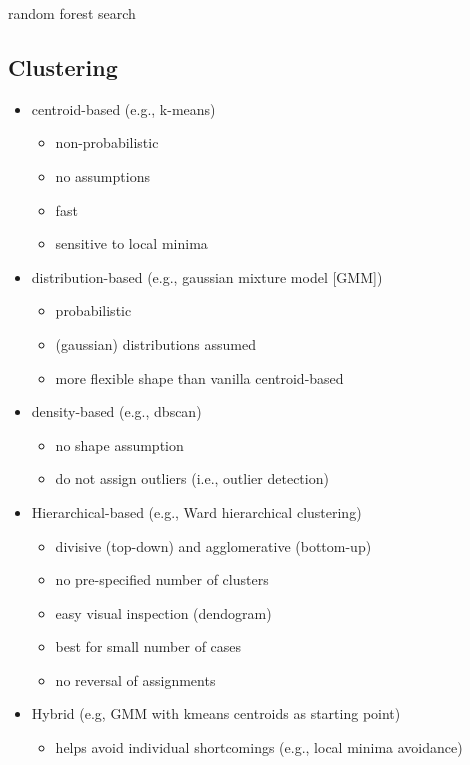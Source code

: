 random forest search \citep[][]{}

\subsection{Clustering}

\begin{itemize}
  \item centroid-based (e.g., k-means)
  \begin{itemize}
    \item non-probabilistic
    \item no assumptions
    \item fast
    \item sensitive to local minima
  \end{itemize}
  \item distribution-based (e.g., gaussian mixture model [GMM])
  \begin{itemize}
    \item probabilistic
    \item (gaussian) distributions assumed
    \item more flexible shape than vanilla centroid-based
  \end{itemize}
  \item density-based (e.g., dbscan)
  \begin{itemize}
    \item no shape assumption
    \item do not assign outliers (i.e., outlier detection)
  \end{itemize}
  \item Hierarchical-based (e.g., Ward hierarchical clustering)
  \begin{itemize}
    \item divisive (top-down) and agglomerative (bottom-up)
    \item no pre-specified number of clusters
    \item easy visual inspection (dendogram)
    \item best for small number of cases
    \item no reversal of assignments
  \end{itemize}
  \item Hybrid (e.g, GMM with kmeans centroids as starting point)
  \begin{itemize}
    \item helps avoid individual shortcomings (e.g., local minima avoidance)
  \end{itemize}
\end{itemize}
